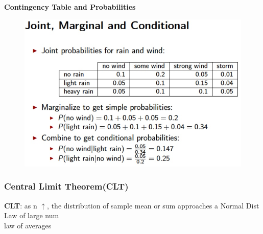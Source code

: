 \documentclass{beamer}
\begin{document}
\begin{frame}[plain]
\begin{figure}%
\end{figure}
\end{frame}


\begin{frame}\textbf{Contingency Table and Probabilities}
\begin{figure}
\includegraphics[scale=0.5]{JointMarginalConditional} 
\end{figure}
\end{frame}



\begin{frame}\frametitle{Central Limit Theorem(CLT)}
\textbf{CLT}: as n $\uparrow$, the distribution of sample mean or sum approaches a Normal Dist\\
Law of large num \\ law of averages\\
\end{frame}
\end{document}
